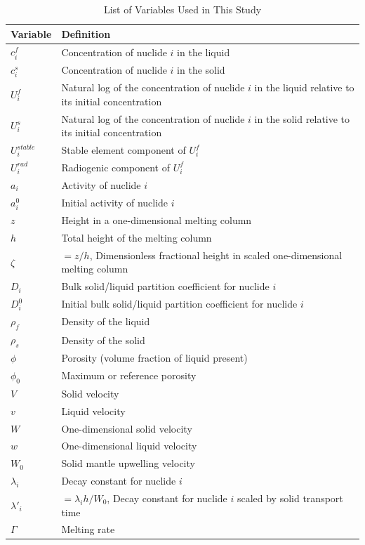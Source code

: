 \documentclass[draft]{agujournal2019}
\begin{document}
\begin{table}[H]
\caption{List of Variables Used in This Study}
\centering
\begin{tabular}{l | l}
\hline
Variable & Definition \\
\hline
$c_i^f$ & Concentration of nuclide $i$ in the liquid \\
$c_i^s$ & Concentration of nuclide $i$ in the solid \\
$U_i^f$ & Natural log of the concentration of nuclide $i$ in the liquid relative to its initial concentration \\
$U_i^s$ & Natural log of the concentration of nuclide $i$ in the solid relative to its initial concentration \\
$U_i^{stable}$ & Stable element component of $U_i^f$ \\
$U_i^{rad}$ & Radiogenic component of $U_i^f$ \\
$a_i$ & Activity of nuclide $i$ \\
$a_i^0$ & Initial activity of nuclide $i$ \\
$z$ & Height in a one-dimensional melting column \\
$h$ & Total height of the melting column \\
$\zeta$ & $=z/h$, Dimensionless fractional height in scaled one-dimensional melting column \\
$D_i$ & Bulk solid/liquid partition coefficient for nuclide $i$ \\
$D_i^0$ & Initial bulk solid/liquid partition coefficient for nuclide $i$ \\
$\rho_{f}$ & Density of the liquid \\
$\rho_{s}$ & Density of the solid \\
$\phi$ & Porosity (volume fraction of liquid present) \\
$\phi_0$ & Maximum or reference porosity \\
$V$ & Solid velocity \\
$v$ & Liquid velocity \\
$W$ & One-dimensional solid velocity \\
$w$ & One-dimensional liquid velocity \\
$W_0$ & Solid mantle upwelling velocity \\
$\lambda_i$ & Decay constant for nuclide $i$ \\
$\lambda'_i$ & $=\lambda_i h/W_0$, Decay constant for nuclide $i$ scaled by solid transport time \\
$\Gamma$ & Melting rate \\

\end{tabular}
\end{table}
\end{document}

